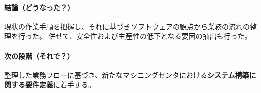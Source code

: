 {\paragraph*{結論（どうなった？）}
現状の作業手順を把握し、それに基づきソフトウェアの観点から業務の流れの整理を行った。
併せて、安全性および生産性の低下となる要因の抽出も行った。
\tcbline*
\paragraph*{次の段階（それで？）}
整理した業務フローに基づき、新たなマシニングセンタにおける\textbf{システム構築に関する要件定義}に着手する。
}





\clearrightpage
\begin{appendices}
\end{appendices}

\clearrightpage
